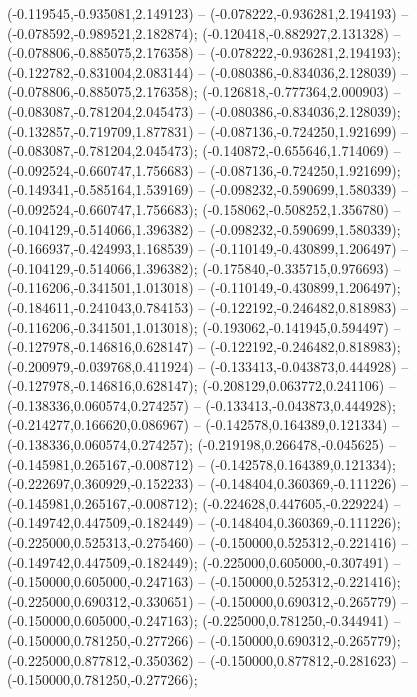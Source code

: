  (-0.119545,-0.935081,2.149123) -- (-0.078222,-0.936281,2.194193) -- (-0.078592,-0.989521,2.182874);
 (-0.120418,-0.882927,2.131328) -- (-0.078806,-0.885075,2.176358) -- (-0.078222,-0.936281,2.194193);
 (-0.122782,-0.831004,2.083144) -- (-0.080386,-0.834036,2.128039) -- (-0.078806,-0.885075,2.176358);
 (-0.126818,-0.777364,2.000903) -- (-0.083087,-0.781204,2.045473) -- (-0.080386,-0.834036,2.128039);
 (-0.132857,-0.719709,1.877831) -- (-0.087136,-0.724250,1.921699) -- (-0.083087,-0.781204,2.045473);
 (-0.140872,-0.655646,1.714069) -- (-0.092524,-0.660747,1.756683) -- (-0.087136,-0.724250,1.921699);
 (-0.149341,-0.585164,1.539169) -- (-0.098232,-0.590699,1.580339) -- (-0.092524,-0.660747,1.756683);
 (-0.158062,-0.508252,1.356780) -- (-0.104129,-0.514066,1.396382) -- (-0.098232,-0.590699,1.580339);
 (-0.166937,-0.424993,1.168539) -- (-0.110149,-0.430899,1.206497) -- (-0.104129,-0.514066,1.396382);
 (-0.175840,-0.335715,0.976693) -- (-0.116206,-0.341501,1.013018) -- (-0.110149,-0.430899,1.206497);
 (-0.184611,-0.241043,0.784153) -- (-0.122192,-0.246482,0.818983) -- (-0.116206,-0.341501,1.013018);
 (-0.193062,-0.141945,0.594497) -- (-0.127978,-0.146816,0.628147) -- (-0.122192,-0.246482,0.818983);
 (-0.200979,-0.039768,0.411924) -- (-0.133413,-0.043873,0.444928) -- (-0.127978,-0.146816,0.628147);
 (-0.208129,0.063772,0.241106) -- (-0.138336,0.060574,0.274257) -- (-0.133413,-0.043873,0.444928);
 (-0.214277,0.166620,0.086967) -- (-0.142578,0.164389,0.121334) -- (-0.138336,0.060574,0.274257);
 (-0.219198,0.266478,-0.045625) -- (-0.145981,0.265167,-0.008712) -- (-0.142578,0.164389,0.121334);
 (-0.222697,0.360929,-0.152233) -- (-0.148404,0.360369,-0.111226) -- (-0.145981,0.265167,-0.008712);
 (-0.224628,0.447605,-0.229224) -- (-0.149742,0.447509,-0.182449) -- (-0.148404,0.360369,-0.111226);
 (-0.225000,0.525313,-0.275460) -- (-0.150000,0.525312,-0.221416) -- (-0.149742,0.447509,-0.182449);
 (-0.225000,0.605000,-0.307491) -- (-0.150000,0.605000,-0.247163) -- (-0.150000,0.525312,-0.221416);
 (-0.225000,0.690312,-0.330651) -- (-0.150000,0.690312,-0.265779) -- (-0.150000,0.605000,-0.247163);
 (-0.225000,0.781250,-0.344941) -- (-0.150000,0.781250,-0.277266) -- (-0.150000,0.690312,-0.265779);
 (-0.225000,0.877812,-0.350362) -- (-0.150000,0.877812,-0.281623) -- (-0.150000,0.781250,-0.277266);
